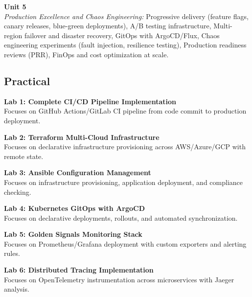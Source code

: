 \vspace{0.3cm}

\noindent\textbf{Unit 5} \\
\textit{Production Excellence and Chaos Engineering:} Progressive delivery (feature flags, canary releases, blue-green deployments), A/B testing infrastructure, Multi-region failover and disaster recovery, GitOps with ArgoCD/Flux, Chaos engineering experiments (fault injection, resilience testing), Production readiness reviews (PRR), FinOps and cost optimization at scale.

\newpage

\subsection*{Practical}
\noindent\textbf{Lab 1: Complete CI/CD Pipeline Implementation} \\
Focuses on GitHub Actions/GitLab CI pipeline from code commit to production deployment.

\vspace{0.2cm}

\noindent\textbf{Lab 2: Terraform Multi-Cloud Infrastructure} \\
Focuses on declarative infrastructure provisioning across AWS/Azure/GCP with remote state.

\vspace{0.2cm}

\noindent\textbf{Lab 3: Ansible Configuration Management} \\
Focuses on infrastructure provisioning, application deployment, and compliance checking.

\vspace{0.2cm}

\noindent\textbf{Lab 4: Kubernetes GitOps with ArgoCD} \\
Focuses on declarative deployments, rollouts, and automated synchronization.

\vspace{0.2cm}

\noindent\textbf{Lab 5: Golden Signals Monitoring Stack} \\
Focuses on Prometheus/Grafana deployment with custom exporters and alerting rules.

\vspace{0.2cm}

\noindent\textbf{Lab 6: Distributed Tracing Implementation} \\
Focuses on OpenTelemetry instrumentation across microservices with Jaeger analysis.

